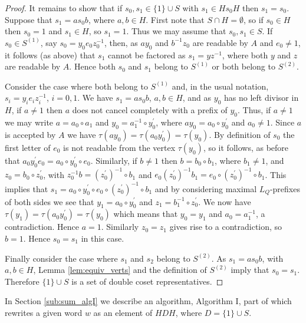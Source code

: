 \documentclass[a4paper,12pt]{article}
\renewcommand{\t}{\tau }
\numberwithin{equation}{section}
\numberwithin{figure}{section}
\begin{document}
\begin{proof}
It remains to show that if $s_0,s_1\in \{1\}\cup S$ with $s_1\in Hs_0H$
then $s_1=s_0$. Suppose that $s_1=as_0b$, where $a, b\in H$.
First note that $S\cap H=\emptyset$, so if $s_0\in H$ then $s_0=1$ and 
$s_1\in H$, so $s_1=1$. 
 Thus we may assume that $s_0,s_1\in S$. 
 If
$s_0\in S^{(1)}$, say $s_0=y_0e_0z_0^{-1}$, then, as $ay_0$ and
$b^{-1}z_0$ are readable by $A$ and $e_0\neq 1$, it follows (as
above) that $s_1$ cannot be factored as $s_1=yz^{-1}$, where both
$y$ and $z$ are readable by $A$. Hence both $s_0$ and $s_1$ belong
to $S^{(1)}$ or both belong to $S^{(2)}$.

Consider the case where both belong to $S^{(1)}$ and, in the usual notation,
$s_i=y_i e_i z_i^{-1}$, $i=0,1$. We have $s_1=as_0b$, $a,b\in H$, and as $y_0$ has
no left divisor in $H$, if $a\neq 1$ then $a$ does not cancel completely with
 a prefix of $y_0$. Thus, if $a\neq 1$ we may write $a=a_0\circ a_1$ and
$y_0=a_1^{-1}\circ y_0^\prime$, where $ay_0=a_0\circ y_0^\prime$
and $a_0\neq 1$. Since
$a$ is accepted by $A$ we have $\t(ay_0)=\t(a_0y_0^\prime)=\t(y_0)$. By definition
of $s_0$ the first letter of $e_0$ is not readable from the vertex $\t(y_0)$, so
it follows, as before that $a_0y_0^\prime e_0=a_0\circ y_0^\prime \circ e_0$. 
Similarly,
if $b\neq 1$ then $b=b_0\circ b_1$, where $b_1\neq 1$,  and $z_0=b_0\circ z_0^\prime$, with
$z_0^{-1}b= (z_0^\prime)^{-1}\circ b_1$ and $e_0 (z_0^\prime)^{-1}b_1=
e_0\circ  (z_0^\prime)^{-1}\circ b_1$. This implies that
$s_1=a_0\circ y_0^\prime \circ  e_0\circ  (z_0^\prime)^{-1}\circ b_1$ and by considering
maximal $L_Q$-prefixes of both sides we see that $y_1=a_0\circ y_0^\prime$ and
$z_1=b_1^{-1}\circ z_0^\prime$. We now have  $\t(y_1)=\t(a_0y_0^\prime)=\t(y_0)$ which
 means that
$y_0=y_1$ and $a_0=a_1^{-1}$,  a contradiction. Hence $a=1$.
Similarly $z_0=z_1$ gives rise to  a contradiction, so $b=1$.
Hence $s_0=s_1$ in this case.

Finally consider the case where $s_1$ and $s_2$ belong to
$S^{(2)}$. As $s_1=as_0b$, with $a,b\in H$, Lemma
\ref{lem:equiv_verts} and the definition of $S^{(2)}$ imply  that
$s_0= s_1$. Therefore $\{1\}\cup S$ is a set of double coset
representatives.
\end{proof}
In Section \ref{sub:sum_algI} we describe an algorithm, Algorithm I, part of 
which rewrites a  given word $w$ as an element of $HDH$, where $D=\{1\}\cup S$.  
\end{document}
